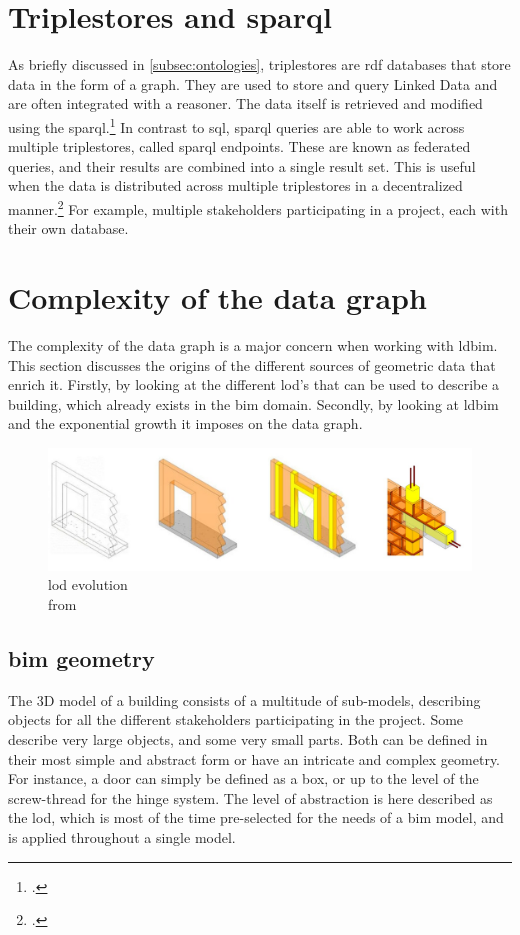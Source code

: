 \section{Triplestores and \acs{sparql}}
As briefly discussed in \ref{subsec:ontologies}, triplestores are \ac{rdf} databases that store data in the form of a graph. They are used to store and query Linked Data and are often integrated with a reasoner. The data itself is retrieved and modified using the \ac{sparql}.\footcite{w3cQuery} In contrast to \ac{sql}, \ac{sparql} queries are able to work across multiple triplestores, called \ac{sparql} endpoints. These are known as federated queries, and their results are combined into a single result set. This is useful when the data is distributed across multiple triplestores in a decentralized manner.\footcite{ontotextSpaql} For example, multiple stakeholders participating in a project, each with their own database.

\section{Complexity of the data graph}
The complexity of the data graph is a major concern when working with \ac{ldbim}. This section discusses the origins of the different sources of geometric data that enrich it. Firstly, by looking at the different \ac{lod}'s that can be used to describe a building, which already exists in the \ac{bim} domain. Secondly, by looking at \ac{ldbim} and the exponential growth it imposes on the data graph.

\begin{figure}[H]
    \centering
    \includegraphics[width=\textwidth]{figures/pdf/LOD.pdf}
    \caption[\acs{lod} evolution]{\acs{lod} evolution\\ from \cite{lod}}
    \label{fig:LOD}
\end{figure}

\subsection{\acs{bim} geometry} \label{subsec:bimGeometry}
The 3D model of a building consists of a multitude of sub-models, describing objects for all the different stakeholders participating in the project. Some describe very large objects, and some very small parts. Both can be defined in their most simple and abstract form or have an intricate and complex geometry. For instance, a door can simply be defined as a box, or up to the level of the screw-thread for the hinge system. The level of abstraction is here described as the \ac{lod}, which is most of the time pre-selected for the needs of a \ac{bim} model, and is applied throughout a single model.

